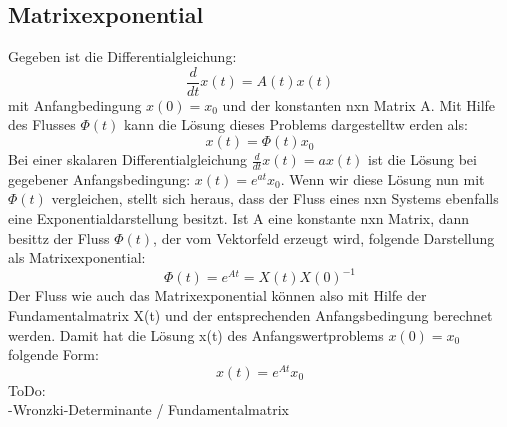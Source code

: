 \subsection{Matrixexponential}
Gegeben ist die Differentialgleichung:
\begin{equation*}
\frac{d}{dt}x(t) = A(t)x(t)
\end{equation*}
mit Anfangbedingung $x(0) = x_0$ und der konstanten nxn Matrix A. Mit Hilfe des Flusses $\Phi(t)$ kann die Lösung dieses Problems dargestelltw erden als: 
\begin{equation*}
x(t) = \Phi(t)x_0
\end{equation*}
Bei einer skalaren Differentialgleichung $\frac{d}{dt}x(t) = ax(t)$ ist die Lösung bei gegebener Anfangsbedingung: $x(t) = e^{at}x_0$. Wenn wir diese Lösung nun mit $\Phi(t)$ vergleichen, stellt sich heraus, dass der Fluss eines nxn Systems ebenfalls eine Exponentialdarstellung besitzt. 
Ist A eine konstante nxn Matrix, dann besittz der Fluss $\Phi(t)$, der vom Vektorfeld erzeugt wird, folgende Darstellung als Matrixexponential: 
\begin{equation*}
\Phi(t) = e^{At} = X(t)X(0)^{-1}
\end{equation*}
Der Fluss wie auch das Matrixexponential können also mit Hilfe der Fundamentalmatrix X(t) und der entsprechenden Anfangsbedingung berechnet werden.
Damit hat die Lösung x(t) des Anfangswertproblems $x(0) = x_0$ folgende Form: 
\begin{equation*}
x(t) = e^{At}x_0
\end{equation*}
ToDo:\\
-Wronzki-Determinante / Fundamentalmatrix 